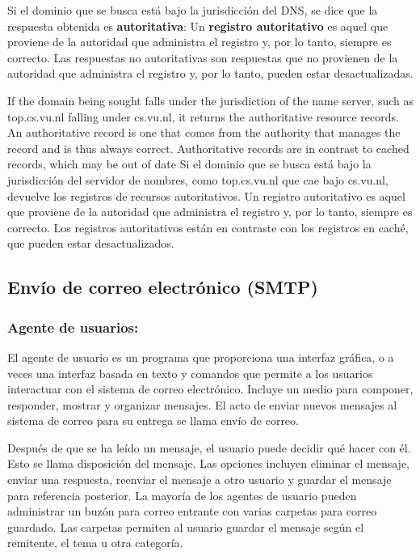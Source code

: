 Si el dominio que se busca está bajo la jurisdicción del DNS, se dice que la respuesta obtenida es \textbf{autoritativa}:  Un \textbf{registro autoritativo} es aquel que proviene de la autoridad que administra el registro y, por lo tanto, siempre es correcto. Las respuestas no autoritativas son respuestas que no provienen de la autoridad que administra el registro y, por lo tanto, pueden estar desactualizadas.

If the domain being sought falls under the jurisdiction of the  
name server, such as top.cs.vu.nl falling under cs.vu.nl, it returns the authoritative  
resource records. An authoritative record is one that comes from the authority  
that manages the record and is thus always correct. Authoritative records are in  
contrast to cached records, which may be out of date 
Si el dominio que se busca está bajo la jurisdicción del servidor de nombres, como top.cs.vu.nl que cae bajo cs.vu.nl, devuelve los registros de recursos autoritativos. Un registro autoritativo es aquel que proviene de la autoridad que administra el registro y, por lo tanto, siempre es correcto. Los registros autoritativos están en contraste con los registros en caché, que pueden estar desactualizados.

\subsection{Envío de correo electrónico (SMTP)}
\subsubsection{Agente de usuarios:}
El agente de usuario es un programa que proporciona una interfaz gráfica, o a veces una interfaz basada en texto y comandos que permite a los usuarios interactuar con el sistema de correo electrónico. Incluye un medio para componer, responder, mostrar y organizar mensajes. El acto de enviar nuevos mensajes al sistema de correo para su entrega se llama envío de correo.

Después de que se ha leído un mensaje, el usuario puede decidir qué hacer con él. Esto se llama disposición del mensaje. Las opciones incluyen eliminar el mensaje, enviar una respuesta, reenviar el mensaje a otro usuario y guardar el mensaje para referencia posterior. La mayoría de los agentes de usuario pueden administrar un buzón para correo entrante con varias carpetas para correo guardado. Las carpetas permiten al usuario guardar el mensaje según el remitente, el tema u otra categoría.

